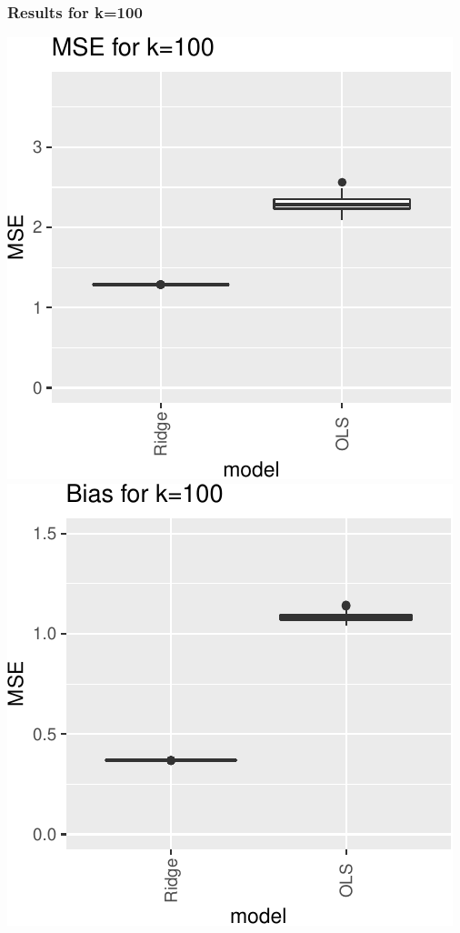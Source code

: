 \documentclass[
]{article}
\begin{document}
\hypertarget{results-for-k100}{%
\subsubsection{Results for k=100}\label{results-for-k100}}

\includegraphics[width=0.8\linewidth]{report_files/figure-latex/unnamed-chunk-3-4}
\includegraphics[width=0.8\linewidth]{report_files/figure-latex/unnamed-chunk-3-5}
\end{document}
